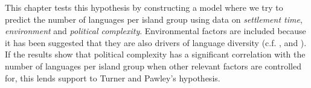 \documentclass[a4paper,10pt]{article} %
\begin{document}
This chapter tests this hypothesis by constructing a model where we try to predict the number of languages per island group using data on \textit{settlement time}, \textit{environment} and \textit{political complexity}. Environmental factors are included because it has been suggested that they are also drivers of language diversity (c.f. \citet{NETTLE1998}, \citet{gavin2012island} and \citet{hua2019ecological}). If the results show that political complexity has a significant correlation with the number of languages per island group when other relevant factors are controlled for, this lends support to Turner and Pawley's hypothesis.
 


 
 
\end{document}
